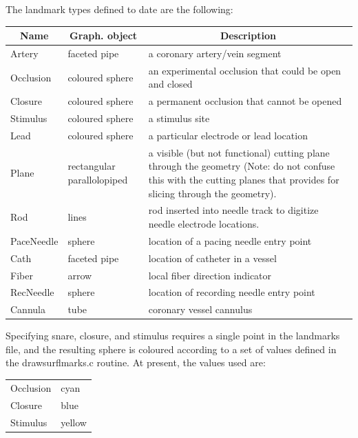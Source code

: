   The landmark types defined to date are the following:
  \begin{center}
  \begin{tabular}{|l|p{1.5in}|p{3.5in}|} \hline
  \multicolumn{1}{|c|}{Name} &
  \multicolumn{1}{|c|}{Graph. object} &
  \multicolumn{1}{|c|}{Description}\\ \hline
  Artery & faceted pipe & a coronary artery/vein segment\\
  Occlusion & coloured sphere & an experimental occlusion that could be open and
  closed \\ 
  Closure & coloured sphere & a permanent occlusion that cannot be opened \\
  Stimulus & coloured sphere & a stimulus site \\
  Lead & coloured sphere & a particular electrode or lead location \\
  Plane & rectangular parallolopiped & a visible (but not functional) cutting
  plane through  the geometry (Note: do not confuse this with the cutting
  planes that \map{} provides for slicing through the  geometry).\\
  Rod & lines & rod inserted into needle track to digitize needle electrode
  locations. \\
  PaceNeedle & sphere & location of a pacing needle entry point\\
  Cath & faceted pipe & location of catheter in a vessel \\
  Fiber & arrow & local fiber direction indicator\\
  RecNeedle & sphere & location of recording needle entry point \\
  Cannula & tube & coronary vessel cannulus \\
  \hline
  \end{tabular}
  \end{center}

  Specifying  snare, closure, and stimulus requires a single point in the
  landmarks file, and the resulting sphere is coloured according to a set of
  values defined in the drawsurflmarks.c routine.  At present, the values
  used are:
  \begin{center}
  \begin{tabular}{|ll|} \hline
    Occlusion & cyan \\ 
    Closure & blue \\
    Stimulus & yellow \\ \hline
  \end{tabular}
  \end{center}

